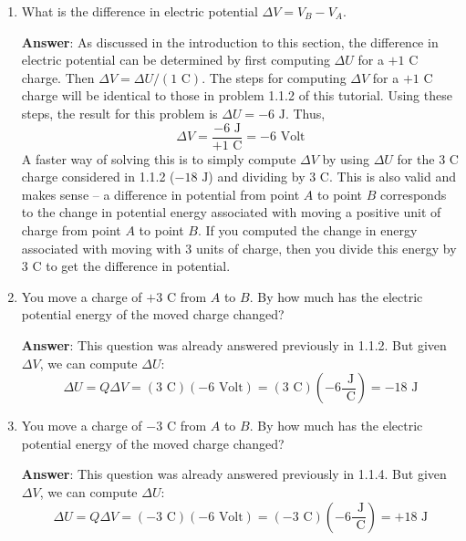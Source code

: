 \documentclass{article}
\begin{document}
\begin{enumerate}

  \item What is the difference in electric potential $\Delta V = V_B-V_A$.

        \ifsolutions
        \textbf{Answer}: As discussed in the introduction to this section, the difference in electric potential can be determined by first computing $\Delta U$ for a $+1\text{ C}$ charge. Then $\Delta V = \Delta U/(1\text{ C})$. The steps for computing $\Delta V$ for a $+1\text{ C}$ charge will be identical to those in problem 1.1.2 of this tutorial. Using these steps, the result for this problem is $\Delta U=-6\text{ J}$. Thus,
        \begin{equation}
        \Delta V = \frac{-6\text{ J}}{+1\text{ C}}= -6\text{ Volt}
        \end{equation}
        A faster way of solving this is to simply compute $\Delta V$ by using $\Delta U$ for the $3\text{ C}$ charge considered in 1.1.2 ($-18\text{ J}$) and dividing by $3\text{ C}$. This is also valid and makes sense -- a difference in potential from point $A$ to point $B$ corresponds to the change in potential energy associated with moving a positive unit of charge from point $A$ to point $B$. If you computed the change in energy associated with moving with 3 units of charge, then you divide this energy by $3\text{ C}$ to get the difference in potential.
        \else
        \vskip 48pt
        \fi

  \item You move a charge of $+3\text{ C}$ from $A$ to $B$. By how much has the electric potential energy of the moved charge changed?

        \ifsolutions
        \textbf{Answer}: This question was already answered previously in 1.1.2. But given $\Delta V$, we can compute $\Delta U$:
        \begin{equation}
        \Delta U = Q\Delta V=(3\text{ C})(-6\text{ Volt})=(3\text{ C})\left(-6\frac{\text{ J}}{ \text{ C}}\right)=-18\text{ J}
        \end{equation}
        \else
        \vskip 48pt
        \fi

  \item You move a charge of $-3\text{ C}$ from $A$ to $B$. By how much has the electric potential energy of the moved charge changed?

        \ifsolutions
        \textbf{Answer}: This question was already answered previously in 1.1.4. But given $\Delta V$, we can compute $\Delta U$:
        \begin{equation}
        \Delta U = Q\Delta V=(-3\text{ C})(-6\text{ Volt})=(-3\text{ C})\left(-6\frac{\text{ J}}{ \text{ C}}\right)=+18\text{ J}
        \end{equation}
        \else
        \vskip 48pt
        \fi


\end{enumerate}
\end{document}
